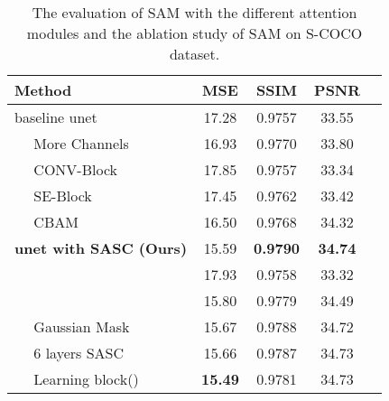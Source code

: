 \begin{table}[h]
\begin{center}
\begin{tabular}{|l|c|c|c|c|}
\hline
Method & MSE & SSIM & PSNR \\
\hline\hline
baseline unet~\cite{Isola:2016tp}  & 17.28         & 0.9757          & 33.55        \\
~~ More Channels  & 16.93  & 0.9770  & 33.80  \\
~~ CONV-Block   & 17.85 &  0.9757 & 33.34  \\
~~ SE-Block~\cite{Hu:2017tf} & 17.45 & 0.9762 & 33.42 \\
~~ CBAM~\cite{Woo:2018wr}  & 16.50 & 0.9768 & 34.32 \\
\textbf{unet with SASC (Ours)} & 15.59 & \textbf{0.9790} & \textbf{34.74} \\
 ~~  & 17.93 & 0.9758 & 33.32 \\
 ~~  & 15.80 & 0.9779 & 34.49 \\
 ~~ Gaussian Mask & 15.67 & 0.9788 & 34.72 \\
 ~~ 6 layers  SASC  & 15.66 & 0.9787 & 34.73 \\
 ~~ Learning block() & \textbf{15.49} & 0.9781 & 34.73  \\
\hline
\end{tabular}
\end{center}

\caption{The evaluation of SAM with the different attention modules and the ablation study of SAM on S-COCO dataset.}
\label{table:evaluation}
\vspace{-2em}
\end{table}
 
